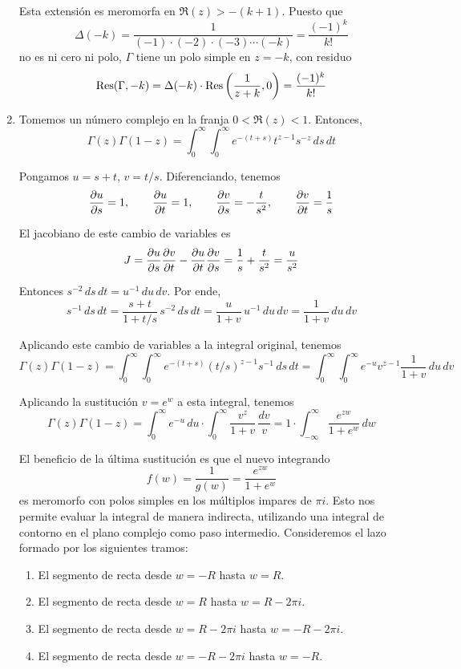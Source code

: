 \begin{solution}
\begin{enumerate}[label=\alph*)]
    Esta extensión es meromorfa en $\Re(z) > -(k+1)$. Puesto que
    $$\Delta(-k) = \frac 1 {(-1) \cdot (-2) \cdot (-3) \cdots (-k)} = \frac {(-1)^k} {k!}$$
    no es ni cero ni polo, $\Gamma$ tiene un polo simple en $z = -k$, con residuo
    $$\operatorname{Res}(\Gamma, -k) = \Delta(-k) \cdot \operatorname{Res} \left( \frac 1 {z+k}, 0 \right) = \frac {(-1)^k} {k!}$$
    
    \item Tomemos un número complejo en la franja $0 < \Re(z) < 1$. Entonces,
    $$\Gamma(z) \Gamma(1-z) = \int_0^\infty \int_0^\infty e^{-(t+s)} t^{z-1} s^{-z} \, ds \, dt$$
    
    Pongamos $u = s + t$, $v = t/s$. Diferenciando, tenemos
    $$
    \frac {\partial u} {\partial s} = 1, \qquad 
    \frac {\partial u} {\partial t} = 1, \qquad
    \frac {\partial v} {\partial s} = -\frac t {s^2}, \qquad
    \frac {\partial v} {\partial t} = \frac 1s
    $$
    
    El jacobiano de este cambio de variables es
    $$J = \frac {\partial u} {\partial s} \frac {\partial v} {\partial t} - \frac {\partial u} {\partial t} \frac {\partial v} {\partial s} = \frac 1s + \frac t {s^2} = \frac u {s^2}$$
    
    Entonces $s^{-2} \, ds \, dt = u^{-1} \, du \, dv$. Por ende,
    $$
    s^{-1} \, ds \, dt
        = \frac {s+t} {1 + t/s} \, s^{-2} \, ds \, dt
        = \frac u {1+v} \, u^{-1} \, du \, dv
        = \frac 1 {1+v} \, du \, dv
    $$
    
    Aplicando este cambio de variables a la integral original, tenemos
    $$
    \Gamma(z) \Gamma(1-z)
        = \int_0^\infty \int_0^\infty e^{-(t+s)} (t/s)^{z-1} s^{-1} \, ds \, dt
        = \int_0^\infty \int_0^\infty e^{-u} v^{z-1} \frac 1 {1+v} \, du \, dv
    $$
    
    Aplicando la sustitución $v = e^w$ a esta integral, tenemos
    $$
    \Gamma(z) \Gamma(1-z)
        = \int_0^\infty e^{-u} \, du \cdot \int_0^\infty \frac {v^z} {1+v} \, \frac {dv} v
        = 1 \cdot \int_{-\infty}^\infty \frac {e^{zw}} {1 + e^w} \, dw
    $$
    
    El beneficio de la última sustitución es que el nuevo integrando
    $$f(w) = \frac 1 {g(w)} = \frac {e^{zw}} {1 + e^w}$$
    es meromorfo con polos simples en los múltiplos impares de $\pi i$. Esto nos permite evaluar la integral de manera indirecta, utilizando una integral de contorno en el plano complejo como paso intermedio. Consideremos el lazo formado por los siguientes tramos:
    \begin{enumerate}[label=\Alph*)]
        \item El segmento de recta desde $w = -R$ hasta $w = R$.
        \item El segmento de recta desde $w = R$ hasta $w = R - 2\pi i$.
        \item El segmento de recta desde $w = R - 2\pi i$ hasta $w = -R - 2\pi i$.
        \item El segmento de recta desde $w = -R - 2\pi i$ hasta $w = -R$.
    \end{enumerate}
    

\end{enumerate}
\end{solution}

